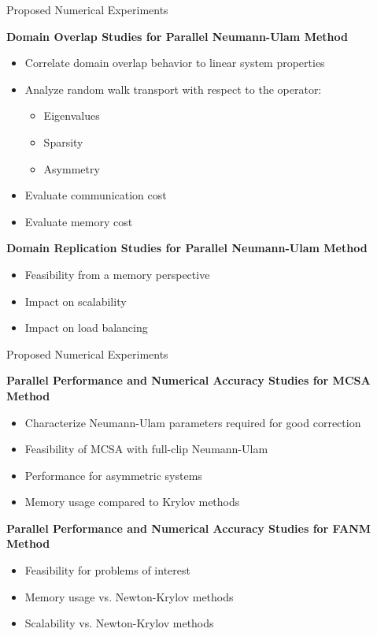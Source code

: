 \documentclass{beamer}
\begin{document}
\begin{frame}{Proposed Numerical Experiments}

  \pause
  \textbf{Domain Overlap Studies for Parallel Neumann-Ulam Method} 
  \begin{itemize}
  \item Correlate domain overlap behavior to linear system properties
  \item Analyze random walk transport with respect to the operator:
    \begin{itemize}
    \item Eigenvalues
    \item Sparsity
    \item Asymmetry
    \end{itemize}
  \item Evaluate communication cost
  \item Evaluate memory cost
  \end{itemize}

  \medskip  \medskip
  \pause
  \textbf{Domain Replication Studies for Parallel Neumann-Ulam Method}
  \begin{itemize}
  \item Feasibility from a memory perspective
  \item Impact on scalability
  \item Impact on load balancing
  \end{itemize}

\end{frame}

\begin{frame}{Proposed Numerical Experiments}

  \textbf{Parallel Performance and Numerical Accuracy Studies for MCSA
    Method}
  \begin{itemize}
  \item Characterize Neumann-Ulam parameters required for good
    correction
  \item Feasibility of MCSA with full-clip Neumann-Ulam
  \item Performance for asymmetric systems
  \item Memory usage compared to Krylov methods
  \end{itemize}

  \medskip  \medskip
  \pause
  \textbf{Parallel Performance and Numerical Accuracy Studies for FANM
    Method}
  \begin{itemize}
  \item Feasibility for problems of interest
  \item Memory usage vs. Newton-Krylov methods
  \item Scalability vs. Newton-Krylov methods
  \end{itemize}

\end{frame}
\end{document}

